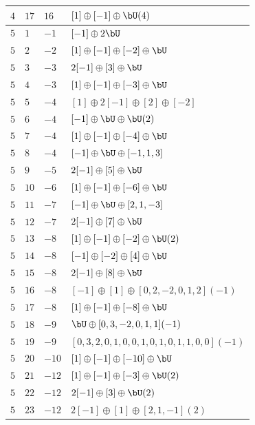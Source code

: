 \begin{center}
\begin{longtable}{llll}
 \(4\) & \(17\) & \(16\) & \([1] \oplus [-1] \oplus \bU(4)\) \\
\midrule
 \(5\) & \(1\) & \(-1\) & \([-1] \oplus 2 \bU\) \\
 \(5\) & \(2\) & \(-2\) & \([1] \oplus [-1] \oplus [-2] \oplus \bU\) \\
 \(5\) & \(3\) & \(-3\) & \(2 [-1] \oplus [3] \oplus \bU\) \\
 \(5\) & \(4\) & \(-3\) & \([1] \oplus [-1] \oplus [-3] \oplus \bU\) \\
 \(5\) & \(5\) & \(-4\) & \([1] \oplus 2[-1] \oplus [2] \oplus [-2]\) \\
 \(5\) & \(6\) & \(-4\) & \([-1] \oplus \bU \oplus \bU(2)\) \\
 \(5\) & \(7\) & \(-4\) & \([1] \oplus [-1] \oplus [-4] \oplus \bU\) \\
 \(5\) & \(8\) & \(-4\) & \([-1] \oplus \bU \oplus [-1, 1, 3]\) \\
 \(5\) & \(9\) & \(-5\) & \(2 [-1] \oplus [5] \oplus \bU\) \\
 \(5\) & \(10\) & \(-6\) & \([1] \oplus [-1] \oplus [-6] \oplus \bU\) \\
 \(5\) & \(11\) & \(-7\) & \([-1] \oplus \bU \oplus [2, 1, -3]\) \\
 \(5\) & \(12\) & \(-7\) & \(2 [-1] \oplus [7] \oplus \bU\) \\
 \(5\) & \(13\) & \(-8\) & \([1] \oplus [-1] \oplus [-2] \oplus \bU(2)\) \\
 \(5\) & \(14\) & \(-8\) & \([-1] \oplus [-2] \oplus [4] \oplus \bU\) \\
 \(5\) & \(15\) & \(-8\) & \(2 [-1] \oplus [8] \oplus \bU\) \\
 \(5\) & \(16\) & \(-8\) & \([-1] \oplus [1] \oplus [0, 2, -2, 0, 1, 2](-1)\) \\
 \(5\) & \(17\) & \(-8\) & \([1] \oplus [-1] \oplus [-8] \oplus \bU\) \\
 \(5\) & \(18\) & \(-9\) & \(\bU \oplus [0, 3, -2, 0, 1, 1](-1)\) \\
 \(5\) & \(19\) & \(-9\) & \([0, 3, 2, 0, 1, 0, 0, 1, 0, 1, 0, 1, 1, 0, 0](-1)\) \\
 \(5\) & \(20\) & \(-10\) & \([1] \oplus [-1] \oplus [-10] \oplus \bU\) \\
 \(5\) & \(21\) & \(-12\) & \([1] \oplus [-1] \oplus [-3] \oplus \bU(2)\) \\
 \(5\) & \(22\) & \(-12\) & \(2 [-1] \oplus [3] \oplus \bU(2)\) \\
 \(5\) & \(23\) & \(-12\) & \(2[-1] \oplus [1] \oplus [2, 1, -1](2)\) \\

\end{longtable}
\end{center}

